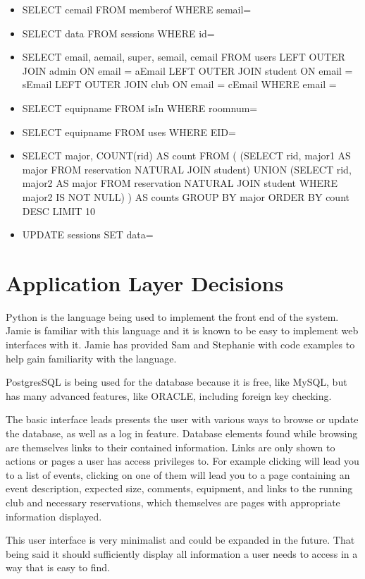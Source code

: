 \documentclass{article}
\begin{document}
\begin{itemize}
\item SELECT cemail FROM memberof WHERE semail=%
\item SELECT data FROM sessions WHERE id=%
\item SELECT email, aemail, super, semail, cemail FROM users LEFT OUTER JOIN admin ON email = aEmail LEFT OUTER JOIN student ON email = sEmail LEFT OUTER JOIN club ON email = cEmail WHERE email = %
\item SELECT equipname FROM isIn WHERE roomnum=%
\item SELECT equipname FROM uses WHERE EID=%
\item SELECT major, COUNT(rid) AS count FROM ( (SELECT rid, major1 AS major FROM reservation NATURAL JOIN student) UNION (SELECT rid, major2 AS major FROM reservation NATURAL JOIN student WHERE major2 IS NOT NULL) ) AS counts GROUP BY major ORDER BY count DESC LIMIT 10
\item UPDATE sessions SET data=%
\end{itemize}

\section{Application Layer Decisions}
Python is the language being used to implement the front end of the system. Jamie is familiar with this language
and it is known to be easy to implement web interfaces with it. Jamie has provided Sam and Stephanie with code examples
to help gain familiarity with the language.

PostgresSQL is being used for the database because it is free, like MySQL, but has many advanced features, like ORACLE,
including foreign key checking.

The basic interface leads presents the user with various ways to browse or update the database, as well as a log in feature.
Database elements found while browsing are themselves links to their contained information.
Links are only shown to actions or pages a user has access privileges to.
For example clicking \event will lead you to a list of events, clicking on one of them will lead you to a page containing
an event description, expected size, comments, equipment, and links to the running club and necessary reservations,
which themselves are pages with appropriate information displayed.

This user interface is very minimalist and could be expanded in the future. That being said it should sufficiently display
all information a user needs to access in a way that is easy to find.
\end{document}

